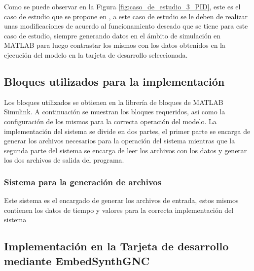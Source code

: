 Como se puede observar en la Figura \ref{fig:caso_de_estudio_3_PID}, este es el caso de estudio que se propone en \cite{microcontrollerslab_pid_controller_design}, a este caso de estudio se le deben de realizar unas modificaciones de acuerdo al funcionamiento deseado que se tiene para este caso de estudio, siempre generando datos en el ámbito de simulación en MATLAB para luego contrastar los mismos con los datos obtenidos en la ejecución del modelo en la tarjeta de desarrollo seleccionada.

\subsection{Bloques utilizados para la implementación}

Los bloques utilizados se obtienen en la librería de bloques de MATLAB Simulink. A continuación se muestran los bloques requeridos, asi como la configuración de los mismos para la correcta operación del modelo. La implementación del sistema se divide en dos partes, el primer parte se encarga de generar los archivos necesarios para la operación del sistema mientras que la segunda parte del sistema se encarga de leer los archivos con los datos y generar los dos archivos de salida del programa.

\subsubsection{Sistema para la generación de archivos}

Este sistema es el encargado de generar los archivos de entrada, estos mismos contienen los datos de tiempo y valores para la correcta implementación del sistema

\subsection{Implementación en la Tarjeta de desarrollo mediante EmbedSynthGNC}